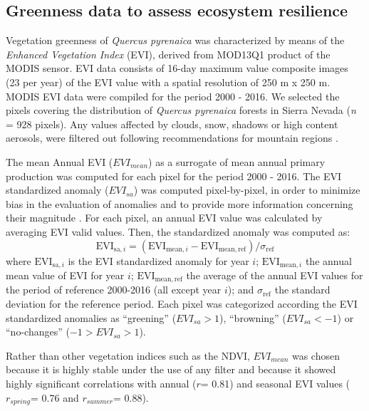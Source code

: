 \subsection{Greenness data to assess ecosystem resilience}\label{sec:dendroEVI}
Vegetation greenness of \emph{Quercus pyrenaica} was characterized by means of the \emph{Enhanced Vegetation Index} (EVI), derived from MOD13Q1 product of the MODIS sensor. EVI data consists of 16-day maximum value composite images (23 per year) of the EVI value with a spatial resolution of 250 m x 250 m. MODIS EVI data were compiled for the period 2000 - 2016. We selected the pixels covering the distribution of \emph{Quercus pyrenaica} forests in Sierra Nevada (\emph{n} = 928 pixels). Any values affected by clouds, snow, shadows or high content aerosols, were filtered out following recommendations for mountain regions \autocite{ReyesDiezetal2015ImplicacionesFiltrado}.

The mean Annual EVI (\(EVI_{mean}\)) as a surrogate of mean annual primary production was computed for each pixel for the period 2000 - 2016. The EVI standardized anomaly (\(EVI_{sa}\)) was computed pixel-by-pixel, in order to minimize bias in the evaluation of anomalies and to provide more information concerning their magnitude \autocite{Samantaetal2012InterpretationVariations}. For each pixel, an annual EVI value was calculated by averaging EVI valid values. Then, the standardized anomaly was computed as: \[\mathrm{EVI_{sa,\mathit{i}}}= (\mathrm{EVI_{mean,\mathit{i}}-EVI_{mean,ref}})\Big/\sigma_{\mathrm{ref}}\]
where \(\mathrm{EVI_{sa,\mathit{i}}}\) is the EVI standardized anomaly for year \(i\); \(\mathrm{EVI_{mean,\mathit{i}}}\) the annual mean value of EVI for year \(i\); \(\mathrm{EVI_{mean,ref}}\) the average of the annual EVI values for the period of reference 2000-2016 (all except year \(i\)); and \(\sigma_{\mathrm{ref}}\) the standard deviation for the reference period. Each pixel was categorized according the EVI standardized anomalies as ``greening'' (\(EVI_{sa} > 1\)), ``browning'' (\(EVI_{sa} <- 1\)) or ``no-changes'' (\(-1 > EVI_{sa} > 1\))\autocite{Samantaetal2012InterpretationVariations}.

Rather than other vegetation indices such as the NDVI, \(EVI_{mean}\) was chosen because it is highly stable under the use of any filter \autocite{ReyesDiezetal2015ImplicacionesFiltrado} and because it showed highly significant correlations with annual (\(r\)= 0.81) and seasonal EVI values (\(r_{spring}\)= 0.76 and \(r_{summer}\)= 0.88).

